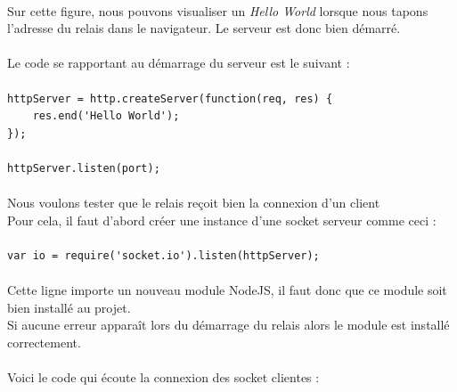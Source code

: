 \documentclass[a4paper,12pt]{report}
\begin{document}
	\paragraph*{}
	Sur cette figure, nous pouvons visualiser un \emph{Hello World} lorsque nous tapons l'adresse du relais dans le navigateur. Le serveur est donc bien démarré.
	
	\paragraph*{}
	Le code se rapportant au démarrage du serveur est le suivant :
	
	\paragraph*{}
	\begin{lstlisting}
httpServer = http.createServer(function(req, res) {
	res.end('Hello World');
});

httpServer.listen(port);
	\end{lstlisting}	
	
	\paragraph*{}
	Nous voulons tester que le relais reçoit bien la connexion d'un client \\
	Pour cela, il faut d'abord créer une instance d'une socket serveur comme ceci :
	
	\paragraph*{}
	\begin{lstlisting}
var io = require('socket.io').listen(httpServer);
	\end{lstlisting}
	
	\paragraph*{}
	Cette ligne importe un nouveau module NodeJS, il faut donc que ce module soit bien installé au projet. \\
	Si aucune erreur apparaît lors du démarrage du relais alors le module est installé correctement.
	
	\paragraph*{}
	Voici le code qui écoute la connexion des socket clientes :
\end{document}
